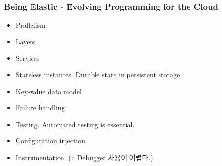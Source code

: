\begin{frame}
\frametitle{Being Elastic - Evolving Programming for the Cloud}

\begin{itemize}
\item Prallelism
\item Layers
\item Services
\item Stateless instances. Durable state in persistent storage
\item Key-value data model
\item Failure handling
\item Testing. Automated testing is essential.
\item Configuration injection
\item Instrumentation. ($\because$ Debugger 사용이 어렵다.)
\end{itemize}

\end{frame}
